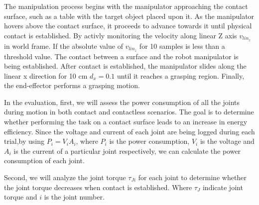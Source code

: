 \documentclass[report.tex]{subfiles}
\begin{document}
    The manipulation process begins with the manipulator approaching the contact surface, such as a table with the target object placed upon it. As the manipulator hovers above the contact surface, it proceeds to advance towards it until physical contact is established. By activly monitoring the velocity along linear Z axis $v_{lin_z}$in world frame. If the absolute value of $v_{lin_z}$ for 10 samples is less than a threshold value. The contact between a surface and the robot manipulator is being established.
    After contact is established, the manipulator slides along the linear x direction for 10 cm $d_{x} = 0.1$ until it reaches a grasping region. Finally, the end-effector performs a grasping motion.
    
    In the evaluation, first, we will assess the power consumption of all the joints during motion in both contact and contactless scenarios. The goal is to determine whether performing the task on a contact surface leads to an increase in energy efficiency. Since the voltage and current of each joint are being logged during each trial,by using $P_i = V_i A_i$, where $P_i$ is the power consumption, $V_i$ is the voltage and $A_i$ is the current of a particular joint respectively, we can calculate the power consumption of each joint.

    Second, we will analyze the joint torque $\tau_{Ji}$ for each joint to determine whether the joint torque decreases when contact is established. Where $\tau_J$ indicate joint torque and $i$ is the joint number.
\end{document}
